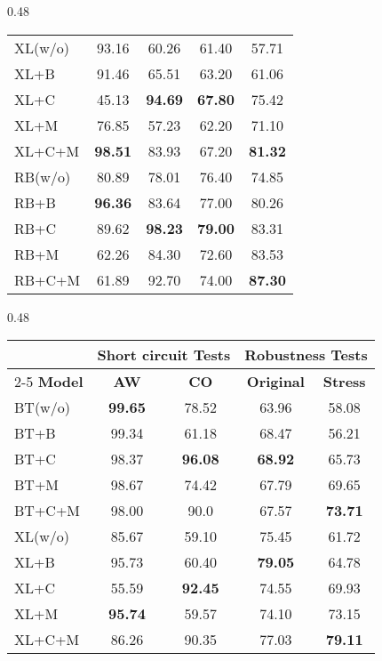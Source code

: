 \begin{table*}[th!]
\begin{subtable}[t]{0.48\textwidth}
\begin{tabular}{l|cc|cc}
\rowcolor{Gray}
XL(w/o)&93.16&60.26&61.40&57.71\\
XL+B&91.46&65.51&63.20&61.06\\
XL+C&45.13&\textbf{94.69}&\textbf{67.80}&75.42\\
XL+M&76.85&57.23&62.20&71.10\\
XL+C+M&\textbf{98.51}&83.93&67.20&\textbf{81.32}\\

\midrule

\rowcolor{Gray}
RB(w/o)&80.89&78.01&76.40&74.85\\
RB+B&\textbf{96.36}&83.64&77.00&80.26\\
RB+C&89.62&\textbf{98.23}&\textbf{79.00}&83.31\\
RB+M&62.26&84.30&72.60&83.53\\
RB+C+M&61.89&92.70&74.00&\textbf{87.30}\\
\bottomrule
\end{tabular}
\caption{COPA}
\end{subtable} 
\hfill
\begin{subtable}[t]{0.48\textwidth}
\centering
\begin{tabular}{l|cc|cc}\toprule
	& \multicolumn{2}{c|}{\bf Short circuit Tests} & \multicolumn{2}{c}{\bf Robustness Tests} \\ \cline{2-5}
\textbf{Model} &\textbf{AW} &\textbf{CO} & \textbf{Original} &\textbf{Stress}\\ \hline
\rowcolor{Gray}
BT(w/o)&\textbf{99.65}&78.52&63.96&58.08\\
BT+B&99.34&61.18&68.47&56.21\\
BT+C&98.37&\textbf{96.08}&\textbf{68.92}&65.73\\
BT+M&98.67&74.42&67.79&69.65\\
BT+C+M&98.00&90.0&67.57&\textbf{73.71}\\
\midrule
                   
\rowcolor{Gray}
XL(w/o)&85.67&59.10&75.45&61.72\\
XL+B&95.73&60.40&\textbf{79.05}&64.78\\
XL+C&55.59&\textbf{92.45}&74.55&69.93\\
XL+M&\textbf{95.74}&59.57&74.10&73.15\\
XL+C+M&86.26&90.35&77.03&\textbf{79.11}\\
\midrule


\end{tabular}
\end{subtable}
\end{table*}
